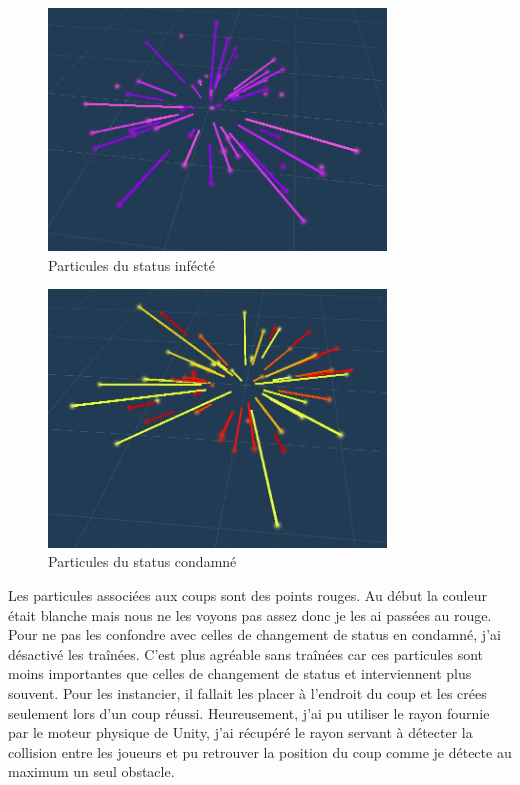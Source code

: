 \documentclass{article}
\begin{document}
\begin{figure}[H]
    \centering
    \includegraphics[width=0.8\textwidth]{cc/particles_infected.JPG}
    \caption{Particules du status infécté}
    \label{Particules du status infécté}
\end{figure}


\begin{figure}[H]
    \centering
    \includegraphics[width=0.8\textwidth]{cc/particles_revenge.JPG}
    \caption{Particules du status condamné}
    \label{Particules du status condamné}
\end{figure}

Les particules associées aux coups sont des points rouges. Au début la couleur était blanche mais nous ne les voyons pas assez donc je les ai passées au rouge. Pour ne pas les confondre avec celles de changement de status en condamné, j'ai désactivé les traînées. C'est plus agréable sans traînées car ces particules sont moins importantes que celles de changement de status et interviennent plus souvent. Pour les instancier, il fallait les placer à l'endroit du coup et les crées seulement lors d'un coup réussi. Heureusement, j'ai pu utiliser le rayon fournie par le moteur physique de Unity, j'ai récupéré le rayon servant à détecter la collision entre les joueurs et pu retrouver la position du coup comme je détecte au maximum un seul obstacle.
\end{document}
